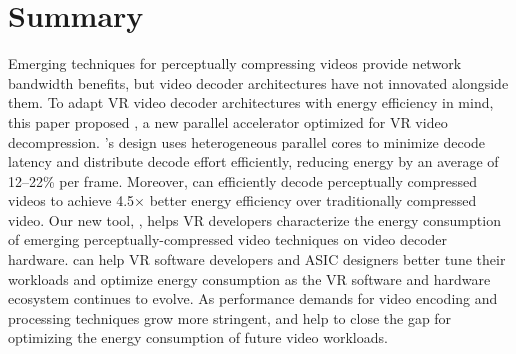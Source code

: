 \section{Summary}
Emerging techniques for perceptually compressing videos provide network bandwidth benefits, but video decoder architectures have not innovated alongside them.
To adapt VR video decoder architectures with energy efficiency in mind, this paper proposed \nameArch, a new parallel accelerator optimized for VR video decompression.
\nameArch's design uses heterogeneous parallel cores to minimize decode latency and distribute decode effort efficiently, reducing energy by an average of 12--22\% per frame.
Moreover, \nameArch can efficiently decode perceptually compressed videos to achieve 4.5$\times$ better energy efficiency over traditionally compressed video.
Our new tool, \nameArchprof, helps VR developers characterize the energy consumption of emerging perceptually-compressed video techniques on video decoder hardware.
\nameArchprof can help VR software developers and ASIC designers better tune their workloads and optimize energy consumption as the VR software and hardware ecosystem continues to evolve.
As performance demands for video encoding and processing techniques grow more stringent, \nameArch and \nameArchprof help to close the gap for optimizing the energy consumption of future video workloads.
